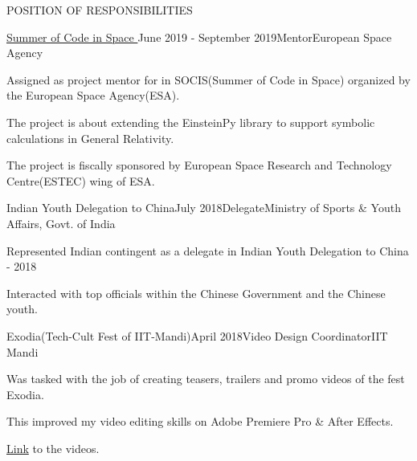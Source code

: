 \documentclass{resume} %
\begin{document}
\begin{rSection}{POSITION OF RESPONSIBILITIES}

\begin{rSubsection}{\href{https://socis.esa.int/projects}{Summer of Code in Space }}{June 2019 - September 2019}{Mentor}{European Space Agency}
\item Assigned as project mentor for in SOCIS(Summer of Code in Space) organized by the European Space Agency(ESA).
\item The project is about extending the EinsteinPy library to support symbolic calculations in General Relativity.
\item The project is fiscally sponsored by European Space Research and Technology Centre(ESTEC) wing of ESA.
\end{rSubsection}


\begin{rSubsection}{Indian Youth Delegation to China}{July 2018}{Delegate}{Ministry of Sports \& Youth Affairs, Govt. of India}
\item Represented Indian contingent as a delegate in Indian Youth Delegation to China - 2018
\item Interacted with top officials within the Chinese Government and the Chinese youth.
\end{rSubsection}


\begin{rSubsection}{Exodia(Tech-Cult Fest of IIT-Mandi)}{April 2018}{Video Design Coordinator}{IIT Mandi}
\item Was tasked with the job of creating teasers, trailers and promo videos of the fest Exodia.
\item This improved my video editing skills on Adobe Premiere Pro \& After Effects.
\item \href{https://www.youtube.com/playlist?list=PLstTANwGhotvZNHDSR__iPnlhg73xYvq4}{Link} to the videos.
\end{rSubsection}

\end{rSection}
\end{document}
